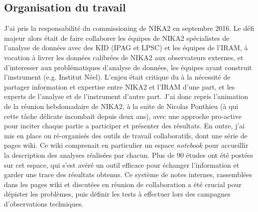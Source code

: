 \subsection{Organisation du travail}

J'ai pris la responsabilité du commissioning de NIKA2 en septembre
2016. Le défi majeur alors était de faire collaborer les équipes de
NIKA2 spécialistes de l'analyse de données avec des KID (IPAG et LPSC)
et les équipes de l'IRAM, à vocation à livrer les données calibrées de
NIKA2 aux observateurs externes, et d'interesser aux problématiques
d'analyse de données, les équipes ayant construit l'instrument
(e.g. Institut Néel). L'enjeu était critique du à la nécessité de
partager information et expertise entre NIKA2 et l'IRAM d'une part, et
les experts de l'analyse et de l'instrument d'autre part. J'ai donc
repris l'animation de la réunion hebdomadaire de NIKA2, à la suite de
Nicolas Ponthieu (à qui cette tâche délicate incombait depuis deux
ans), avec une approche pro-active pour inciter chaque partie a
participer et présenter des résultats. En outre, j'ai mis en place ou
ré-organisés des outils de travail collaboratifs, dont une série de
pages wiki. Ce wiki comprenait en particulier un espace
\emph{notebook} pour accueillir la description des analyses réalisées
par chacun. Plus de 90 études ont été postées sur cet espace, qui
s'est avéré un outil efficace pour échanger l'information et garder
une trace des résultats obtenus. Ce système de notes internes,
rassemblées dans les pages wiki et discutées en réunion de
collaboration a été crucial pour dépister les problèmes, puis définir
les tests à effectuer lors des campagnes d'observations techniques.

